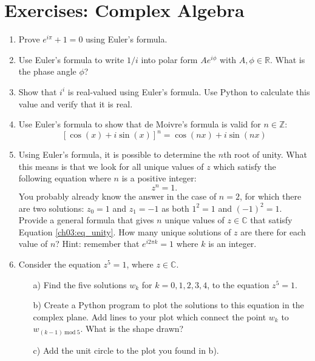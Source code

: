 \newpage
\section{Exercises: Complex Algebra}

\begin{enumerate}
  \item Prove $e^{i\pi}+1=0$ using Euler's formula.

  \item Use Euler's formula to write $1/i$ into polar form $Ae^{i\phi}$ with $A,\phi\in\mathbb{R}$.
        What is the phase angle $\phi$?

  \item Show that $i^{i}$ is real-valued using Euler's formula.
        Use Python to calculate this value and verify that it is real.

  \item Use Euler's formula to show that de Moivre's formula is valid for $n\in\mathbb{Z}$:
        \[[\cos(x)+i\sin(x)]^{n}=\cos(nx)+i\sin(nx)\]

  \item Using Euler's formula, it is possible to determine the $n$th root of unity.
        What this means is that we look for all unique values of $z$ which
        satisfy the following equation where $n$ is a positive integer:
        \begin{equation}
          z^{n} = 1.
          \label{ch03:eq_unity}
        \end{equation}
        You probably already know the answer in the case of $n=2$, for which there are two solutions:
        $z_{0}=1$ and $z_{1}=-1$ as both $1^{2}=1$ and $(-1)^{2}=1$. \\
        Provide a general formula that gives $n$ unique values of $z\in\mathbb{C}$ that
        satisfy Equation \ref{ch03:eq_unity}. How many unique solutions of $z$ are there
        for each value of $n$? Hint: remember that $e^{i 2\pi k} = 1$ where
        $k$ is an integer.

  \item Consider the equation $z^{5}=1$, where $z\in\mathbb{C}$.
        \begin{itemize}
          \item[a)] Find the five solutions $w_{k}$ for $k=0,1,2,3,4$, to the equation $z^{5}=1$.
          \item[b)] Create a Python program to plot the solutions to this equation in the complex plane. Add lines to your plot which connect the point $w_{k}$ to $w_{(k-1)~\mathrm{mod}~5}$. What is the shape drawn?
          \item[c)] Add the unit circle to the plot you found in b).
        \end{itemize}


\end{enumerate}
